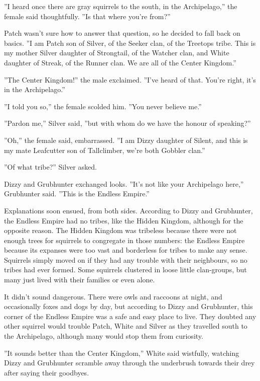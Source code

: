 \documentclass[12pt]{book}
\begin{document}
''I heard once there are gray squirrels to the south, in the
Archipelago,'' the female said thoughtfully. ''Is that where you're
from?''

Patch wasn't sure how to answer that question, so he decided to fall
back on basics. ''I am Patch son of Silver, of the Seeker clan, of the
Treetops tribe. This is my mother Silver daughter of Strongtail, of
the Watcher clan, and White daughter of Streak, of the Runner clan. We
are all of the Center Kingdom.''

''The Center Kingdom!'' the male exclaimed. ''I've heard of
that. You're right, it's in the Archipelago.''

''I told you so,'' the female scolded him. ''You never believe me.''

''Pardon me,'' Silver said, ''but with whom do we have the honour of
speaking?''

''Oh,'' the female said, embarrassed. ''I am Dizzy daughter of Silent,
and this is my mate Leafcutter son of Tallclimber, we're both Gobbler
clan.''

''Of what tribe?'' Silver asked.

Dizzy and Grubhunter exchanged looks. ''It's not like your Archipelago
here,'' Grubhunter said. ''This is the Endless Empire.''

Explanations soon ensued, from both sides. According to Dizzy and
Grubhunter, the Endless Empire had no tribes, like the Hidden Kingdom,
although for the opposite reason. The Hidden Kingdom was tribeless
because there were not enough trees for squirrels to congregate in
those numbers: the Endless Empire because its expanses were too vast
and borderless for tribes to make any sense. Squirrels simply moved on
if they had any trouble with their neighbours, so no tribes had ever
formed. Some squirrels clustered in loose little clan-groups, but many
just lived with their families or even alone.

It didn't sound dangerous. There were owls and raccoons at night, and
occasionally foxes and dogs by day, but according to Dizzy and
Grubhunter, this corner of the Endless Empire was a safe and easy
place to live. They doubted any other squirrel would trouble Patch,
White and Silver as they travelled south to the Archipelago, although
many would stop them from curiosity.

''It sounds better than the Center Kingdom,'' White said wistfully,
watching Dizzy and Grubhunter scramble away through the underbrush
towards their drey after saying their goodbyes.
\end{document}
